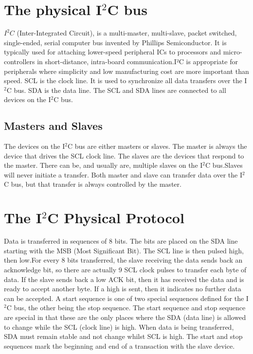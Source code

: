 \documentclass[12pt,twocolumn]{IEEEtran}
\begin{document}
    \section{The physical I$^{2}$C bus}
    $I^{2}C$ (Inter-Integrated Circuit),  is a multi-master, multi-slave, packet switched, single-ended, serial computer bus invented by Phillips Semiconductor. It is typically used for attaching lower-speed peripheral ICs to processors and micro-controllers in short-distance, intra-board communication.I²C is appropriate for peripherals where simplicity and low manufacturing cost are more important than speed. \newline SCL is the clock line. It is used to synchronize all data transfers over the I$^{2}$C bus. SDA is the data line. The SCL and SDA lines are connected to all devices on the I$^{2}$C bus.

  \subsection{Masters and Slaves}
      The devices on the I$^{2}$C bus are either masters or slaves. The master is always the device that drives the SCL clock line. The slaves are the devices that 
      respond to the master. There can be, and usually are, multiple slaves on the I$^{2}$C bus.Slaves will never initiate a transfer. Both master and slave can transfer 
      data over the I$^{2}$C bus, but that transfer is always controlled by the master.
  
  \section{The I$^{2}$C Physical Protocol}

    Data is transferred in sequences of 8 bits. The bits are placed on the SDA line starting with the MSB (Most Significant Bit). The SCL line is then pulsed high, then low.For every 8 bits transferred, the slave receiving the data sends back an acknowledge bit, so there are actually 9 SCL clock pulses to transfer each byte of data. If the slave sends back a low ACK bit, then it has received the data and is ready to accept another byte. If a high is sent, then it indicates no further data can be accepted. 
A start sequence is one of two special sequences defined for the I$^{2}$C bus, the other being the stop sequence. The start sequence and stop sequence are special in that these are the only places where the SDA (data line) is allowed to change while the SCL (clock line) is high. When data is being transferred, SDA must remain stable and not change whilst SCL is high. The start and stop sequences mark the beginning and end of a transaction with the slave device.
\end{document}

